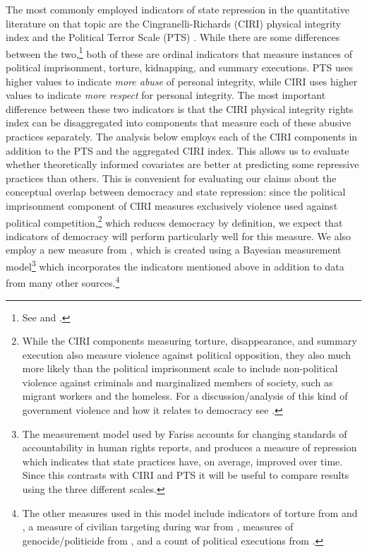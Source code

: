 \documentclass[12pt]{article}
\begin{document}
The most commonly employed indicators of state repression in the quantitative literature on that topic are the Cingranelli-Richards (CIRI) physical integrity index \citep{CIRI2010} and the Political Terror Scale (PTS) \citep{GibneyCornettWood2009}. While there are some differences between the two,\footnote{See \citet{WoodGibney2010} and \citet{CingranelliRichards2010}.} both of these are ordinal indicators that measure instances of political imprisonment, torture, kidnapping, and summary executions. PTS uses higher values to indicate {\em more abuse} of personal integrity, while CIRI uses higher values to indicate {\em more respect} for personal integrity. The most important difference between these two indicators is that the CIRI physical integrity rights index can be disaggregated into components that measure each of these abusive practices separately. The analysis below employs each of the CIRI components in addition to the PTS and the aggregated CIRI index. This allows us to evaluate whether theoretically informed covariates are better at predicting some repressive practices than others. This is convenient for evaluating our claims about the conceptual overlap between democracy and state repression: since the political imprisonment component of CIRI measures exclusively violence used against political competition,\footnote{While the CIRI components measuring torture, disappearance, and summary execution also measure violence against political opposition, they also much more likely than the political imprisonment scale to include non-political violence against criminals and marginalized members of society, such as migrant workers and the homeless. For a discussion/analysis of this kind of government violence and how it relates to democracy see \citet{Haschke2011}.} which reduces democracy by definition, we expect that indicators of democracy will perform particularly well for this measure. We also employ a new measure from \citet{Fariss2013}, which is created using a Bayesian measurement model\footnote{The measurement model used by Fariss accounts for changing standards of accountability in human rights reports, and produces a measure of repression which indicates that state practices have, on average, improved over time. Since this contrasts with CIRI and PTS it will be useful to compare results using the three different scales.} which incorporates the indicators mentioned above in addition to data from many other sources.\footnote{The other measures used in this model include indicators of torture from \citet{Hathaway2002} and \citet{ConradHaglundMoore2012}, a measure of civilian targeting during war from \citet{EckHultman2007}, measures of genocide/politicide from \citet{HarffGurr1988,Rummel1995,MarshallHarffGurr2009}, and a count of political executions from \citet{TaylorJodice1983}.} 
\end{document}
